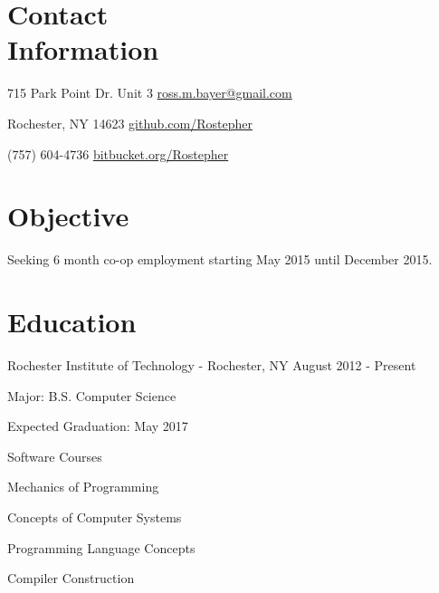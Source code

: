 \documentclass[a4paper,margin,line]{resume}
\newcommand{\rdate}[1]{\hfill {\small #1}}
\begin{document}
\vspace{10mm}
\begin{resume}
\section{\mysidestyle Contact \\ Information} \vspace{2mm}
	\begin{asparablank}
		\item 715 Park Point Dr. Unit 3 \hfill \href{mailto:ross.m.bayer@gmail.com}{ross.m.bayer@gmail.com}
		\item Rochester, NY 14623 \hfill \href{https://github.com/Rostepher}{github.com/Rostepher}
		\item (757) 604-4736 \hfill \href{https://bitbucket.org/Rostepher}{bitbucket.org/Rostepher}
	\end{asparablank}

\section{\mysidestyle Objective}
	\begin{asparablank}
    	\item Seeking 6 month co-op employment starting May 2015 until December 2015.
	\end{asparablank}

\section{\mysidestyle Education}
	\begin{compactdesc}
		\item[Rochester Institute of Technology] - Rochester, NY \rdate{August 2012 - Present}
		\begin{asparablank} { \small
			\item Major: B.S. Computer Science
		} \end{asparablank}
		\begin{asparablank} { \small
			\item Expected Graduation: May 2017
		} \end{asparablank}
	    \begin{asparablank} { \small
            \item Software Courses
			\begin{compactitem} { \small
                \item \hspace{1mm} Mechanics of Programming
                \item \hspace{1mm} Concepts of Computer Systems
                \item \hspace{1mm} Programming Language Concepts
                \item \hspace{1mm} Compiler Construction
			} \end{compactitem}
        } \end{asparablank}
	\end{compactdesc}


\end{resume}
\end{document}
